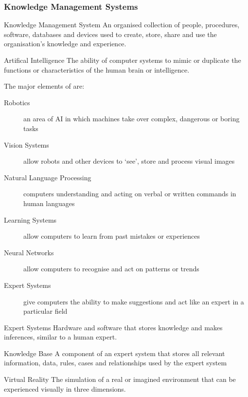 \documentclass[\main/notes.tex]{subfiles}
\begin{document}
				\subsubsection{Knowledge Management Systems}
					\begin{definition}{Knowledge Management System}
						An organised collection of people, procedures, software, databases and devices used to create, store, share and use the organisation's knowledge and experience.
					\end{definition}
					\begin{definition}{Artifical Intelligence}
						The ability of computer systems to mimic or duplicate the functions or characteristics of the human brain or intelligence.
					\end{definition}
					The major elements of  are:
					\begin{indentparagraph}
						\begin{description}
							\item[Robotics] an area of AI in which machines take over complex, dangerous or boring tasks
							\item[Vision Systems] allow robots and other devices to `see', store and process visual images
							\item[Natural Language Processing] computers understanding and acting on verbal or written commands in human languages
							\item[Learning Systems ] allow computers to learn from past mistakes or experiences
							\item[Neural Networks] allow computers to recognise and act on patterns or trends
							\item[Expert Systems] give computers the ability to make suggestions and act like an expert in a particular field 
						\end{description}
					\end{indentparagraph}
					\begin{definition}{Expert Systems}
						Hardware and software that stores knowledge and makes inferences, similar to a human expert.
					\end{definition}
					\begin{definition}{Knowledge Base}
						A component of an expert system that stores all relevant information, data, rules, cases and relationships used by the expert system
					\end{definition}
					\begin{definition}{Virtual Reality}
						The simulation of a real or imagined environment that can be experienced visually in three dimensions.
					\end{definition}
			\pagebreak
\end{document}
